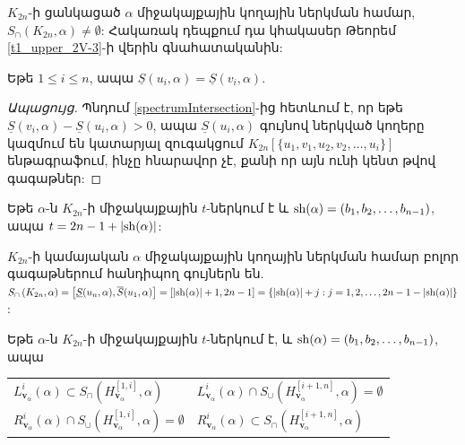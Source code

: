 \begin{hide}
\begin{remark}
\label{spectrumIntersection}
$K_{2n}$-ի ցանկացած $\alpha$ միջակայքային կողային ներկման համար, $S_\cap\left(K_{2n}, \alpha\right) \neq \emptyset$: Հակառակ դեպքում դա կհակասեր Թեորեմ \ref{t1_upper_2V-3}-ի վերին գնահատականին:
\end{remark}

\begin{lemma}
Եթե $1 \leq i \leq n$, ապա $\underline{S}(u_i, \alpha) = \underline{S}(v_i, \alpha)$.
\end{lemma}
\begin{proof}[Ապացույց]
Պնդում \ref{spectrumIntersection}-ից հետևում է, որ եթե $\underline{S}(v_i, \alpha) - \underline{S}(u_{i}, \alpha) > 0$, ապա $\underline{S}(u_{i}, \alpha)$ գույնով ներկված կողերը կազմում են կատարյալ զուգակցում $K_{2n}\left[\{u_1,v_1,u_2,v_2,\ldots,u_i\}\right]$ ենթագրաֆում, ինչը հնարավոր չէ, քանի որ այն ունի կենտ թվով գագաթներ:
\end{proof}

\begin{remark}
\label{totalShift}
Եթե $\alpha$-ն $K_{2n}$-ի միջակայքային $t$-ներկում է և ${\rm sh}(\alpha) = (b_1, b_2, \ldots, b_{n-1})$, ապա $t = 2n-1 + |{\rm sh}(\alpha)|$:
\end{remark}

\begin{remark}
\label{middleColors}
$K_{2n}$-ի կամայական $\alpha$ միջակայքային կողային ներկման համար բոլոր գագաթներում հանդիպող գույներն են. $S_\cap\left(K_{2n}, \alpha\right) = \left[\underline{S}(u_n, \alpha), \overline{S}(u_1, \alpha)\right] = \left[|{\rm sh}(\alpha)|+1, 2n-1\right] = \left\{|{\rm sh}(\alpha)|+j  : j=1,2,\ldots,2n-1-|{\rm sh}(\alpha)|\right\}$:
\end{remark}

\begin{remark}
\label{splittedColors}
Եթե $\alpha$-ն $K_{2n}$-ի միջակայքային $t$-ներկում է, և ${\rm sh}(\alpha) = (b_1, b_2, \ldots, b_{n-1})$, ապա
\begin{center}
\begin{tabular}{ll}
$L_{\mathbf{v}_\alpha}^i(\alpha) \subset S_\cap\left(H_{\mathbf{v}_\alpha}^{[1,i]},\alpha\right)$
&$L_{\mathbf{v}_\alpha}^i(\alpha) \cap S_\cup\left(H_{\mathbf{v}_\alpha}^{[i+1,n]},\alpha\right) = \emptyset$\\
$R_{\mathbf{v}_\alpha}^i(\alpha) \cap S_\cup\left(H_{\mathbf{v}_\alpha}^{[1,i]},\alpha\right) = \emptyset$ 
&$R_{\mathbf{v}_\alpha}^i(\alpha) \subset S_\cap\left(H_{\mathbf{v}_\alpha}^{[i+1,n]},\alpha\right)$
\end{tabular}
\end{center}
\end{remark}
\end{hide}

